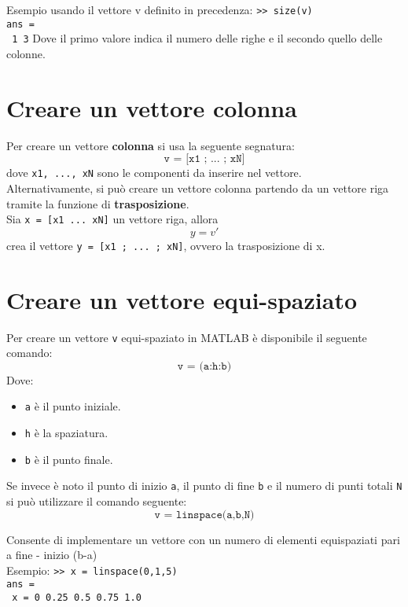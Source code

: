 Esempio usando il vettore v definito in precedenza: 
\texttt{>> size(v)} \\
\texttt{ans = } \\
\texttt{\hspace{0.5cm} 1 \hspace{0.5cm} 3} \break
Dove il primo valore indica il numero delle righe e il secondo quello delle colonne.

\section{Creare un vettore colonna}
Per creare un vettore \textbf{colonna} si usa la seguente segnatura:
$$ \texttt{v = [x1 ; ... ; xN]} $$
dove \texttt{x1, ..., xN} sono le componenti da inserire nel vettore. \\
Alternativamente, si può creare un vettore colonna partendo da un vettore riga tramite la funzione di 
\textbf{trasposizione}. \\
Sia \texttt{x = [x1 ... xN]} un vettore riga, allora 
$$ y = v' $$
crea il vettore \texttt{y = [x1 ; ... ; xN]}, ovvero la trasposizione di x.

\section{Creare un vettore equi-spaziato}
Per creare un vettore \texttt{v} equi-spaziato in MATLAB è disponibile il seguente comando:
$$ \texttt{v = (a:h:b)} $$
Dove:
\begin{itemize}
	\item 	\texttt{a} è il punto iniziale.
	\item	\texttt{h} è la spaziatura.
	\item	\texttt{b} è il punto finale.
\end{itemize}

Se invece è noto il punto di inizio \texttt{a}, il punto di fine \texttt{b} e il numero di punti totali \texttt{N} si 
può utilizzare il comando seguente:
$$ \texttt{v = linspace(a,b,N)} $$

Consente di implementare un vettore con un numero di elementi equispaziati pari a fine - inizio (b-a)\\
Esempio:
\texttt{>> x = linspace(0,1,5)} \\
\texttt{ans = } \\
\texttt{\hspace{0.5cm} x = 0 \hspace{0.5cm} 0.25 \hspace{0.5cm} 0.5 \hspace{0.5cm} 0.75 \hspace{0.5cm} 1.0} \break

